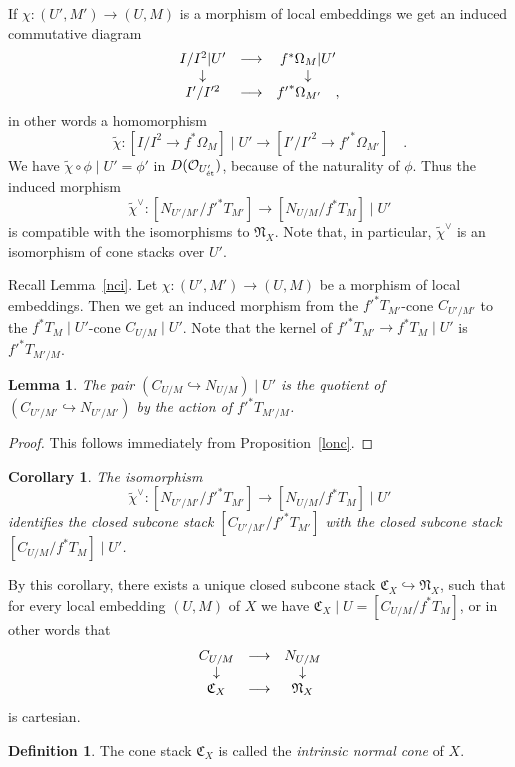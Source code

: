 \documentclass[11pt]{article}
\theoremstyle{plain}
\newtheorem{lem}[prop]{Lemma}
\newtheorem{cor}[prop]{Corollary}
\theoremstyle{definition}
\newtheorem{defnp}[prop]{Definition}
\newenvironment{defn}{\begin{defnp}\normalfont}{\end{defnp}}
\newenvironment{pf}{\begin{proof}}{\end{proof}}
\renewcommand{\tilde}{\widetilde}
\newcommand{\dual}[1]{{{#1}^{\vee}}}
\newcommand{\et}{{\mbox{\tiny \'{e}t}}}
\newcommand{\upst}{^{\ast}}
\newcommand{\NN}{{\mathfrak{N}}}
\newcommand{\CC}{{\mathfrak{C}}}
\renewcommand{\O}{{\mathcal{O}}}
\newcommand{\resto}{{ \mid }}
\newcommand{\comp}{\mathbin{{\scriptstyle\circ}}}
\newcommand{\ldiag}[1]
       {\makebox[0cm]{\({\scriptstyle#1}\downarrow\phantom{\scriptstyle#1}\)}}
\newcommand{\rdiag}[1]
       {\makebox[0cm]{\(\phantom{\scriptstyle#1}\downarrow{\scriptstyle#1}\)}}
\newcommand{\comdia}[9]{
\begin{array}{ccc}
#1 & \stackrel{#2}{\longrightarrow} & #3 \\
\ldiag{#4} & #5 & \rdiag{#6} \\
#7 & \stackrel{#8}{\longrightarrow} & #9
\end{array}}
\theoremstyle{plain}
\theoremstyle{definition}
\theoremstyle{remark}
\begin{document}
If \(\chi:(U',M')\rightarrow(U,M)\) is a morphism of local embeddings we get an
induced commutative diagram
\[
\comdia{I/I^2\resto U'}{}{{f}\upst\Omega_{M}\resto
U'}{}{}{}{I'/I'^2}{ }{{f'}\upst\Omega_{M'}\quad,}
\]
in other words a
homomorphism
\[
\tilde{\chi}:[I/I^2\rightarrow{f}\upst\Omega_{M}]\resto
U'\longrightarrow[I'/I'^2\rightarrow{f'}\upst\Omega_{M'}]
\quad.
\]
We have
\(\tilde{\chi}\comp\phi\resto U'=\phi'\) in \(D(\O_{U'_\et})\), because of
the naturality of \(\phi\). Thus the induced morphism
\[
\dual{\tilde{\chi}}:[N_{U'/M'}/{f'}\upst
T_{M'}]\longrightarrow[N_{U/M}/f\upst T_M]\resto U'
\]
is compatible with the isomorphisms to
\(\NN_X\). Note that, in particular,
\(\dual{\tilde{\chi}}\) is an isomorphism of cone stacks over \(U'\).

Recall Lemma~\ref{nci}. Let \(\chi:(U',M')\rightarrow(U,M)\) be a morphism of
local embeddings. Then we get an induced morphism from the \({f'}\upst
T_{M'}\)-cone \(C_{U'/M'}\) to the \(f\upst T_M\resto U'\)-cone \(C_{U/M}\resto U'\).
Note that the kernel of \({f'}\upst T_{M'}\rightarrow f\upst T_M\resto U'\) is
\({f'}\upst T_{M'/M}\).

\begin{lem} The  pair \((C_{U/M}\hookrightarrow N_{U/M})\resto U'\) is the
quotient of \((C_{U'/M'}\hookrightarrow N_{U'/M'})\) by the action of \({f'}\upst
T_{M'/M}\).
\end{lem}
\begin{pf} This follows immediately from Proposition~\ref{lonc}.
\end{pf}

\begin{cor} The isomorphism
\[
\dual{\tilde{\chi}}:[N_{U'/M'}/{f'}\upst
T_{M'}]\longrightarrow[N_{U/M}/f\upst T_M]\resto U'
\]
identifies the closed subcone stack \([C_{U'/M'}/{f'}\upst T_{M'}]\)
with the closed subcone stack \([C_{U/M}/f\upst T_M]\resto U'\).
\end{cor}

By this corollary, there exists a unique closed subcone stack
\(\CC_X\hookrightarrow \NN_X\), such that for every local embedding
\((U,M)\) of \(X\) we have \(\CC_X\resto U=[C_{U/M}/f\upst T_M]\), or in
other words that
\[
\comdia{C_{U/M}}{}{N_{U/M}}{}{}{}{\CC_X}{}{\NN_X}
\]
is cartesian.

\begin{defn}
The cone stack \(\CC_X\) is called the {\em intrinsic normal cone }of
\(X\).
\end{defn}
\end{document}
